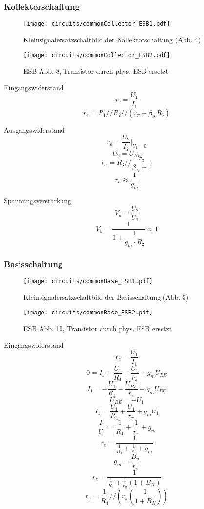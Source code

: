 \subsubsection{Kollektorschaltung}
\begin{figure}[H]
  \begin{center}
    \texttt{[image: circuits/commonCollector\_ESB1.pdf]}
  \end{center}
  \caption{Kleinsignalersatzschaltbild der Kollektorschaltung (Abb. 4)}
\end{figure}


\begin{figure}[H]
  \begin{center}
   \texttt{[image: circuits/commonCollector\_ESB2.pdf]}
  \end{center}
  \caption{ESB Abb. 8, Transistor durch phys. ESB ersetzt}
\end{figure}
\noindent Eingangswiderstand
\[ r_e = \frac{U_1}{I_1}\]
\[ r_e = R_1 // R_2 // (r_\pi + \beta_N R_3)\]

\noindent Ausgangswiderstand
\[ r_a = \frac{U_2}{I_2}|_{U_1 = 0}\]
\[U_2 = U_{BE}\]
\[r_a = R_3 // \frac{r_\pi }{\beta_N + 1}\]
\[r_a \approx \frac{1}{g_m}\]

\noindent Spannungsverstärkung
\[ V_u = \frac{U_2}{U_1}\]
\[V_u = \frac{1}{1+ \dfrac{1}{g_m \cdot R_3}} \approx 1\]

\subsubsection{Basisschaltung}
\begin{figure}[H]
  \begin{center}
    \texttt{[image: circuits/commonBase\_ESB1.pdf]}
  \end{center}
  \caption{Kleinsignalersatzschaltbild der Basisschaltung (Abb. 5)}
\end{figure}

\begin{figure}[H]
  \begin{center}
    \texttt{[image: circuits/commonBase\_ESB2.pdf]}
  \end{center}
  \caption{ESB Abb. 10, Transistor durch phys. ESB ersetzt}
\end{figure}

\noindent Eingangswiderstand
\[ r_e = \frac{U_1}{I_1}\]
\[0 = I_1 + \frac{U_1}{R_4} + \frac{U_1}{r_\pi} + g_m U_{BE} \]
\[I_1 = - \frac{U_1}{R_4} - \frac{U_{BE}}{r_\pi} - g_m U_{BE} \]
\[U_{BE} = - U_1\]
\[I_1 = \frac{U_1}{R_4} + \frac{U_1}{r_\pi} + g_m U_{1} \]
\[ \frac{I_1}{U_1} = \frac{1}{R_4} + \frac{1}{r_\pi} + g_m \]
\[ r_e = \frac{1}{ \frac{1}{R_4} + \frac{1}{r_\pi} + g_m} \]
\[g_m = \frac{B_n}{r_\pi}\]
\[ r_e = \frac{1}{\frac{1}{R_4} + \frac{1}{r_\pi} (1+B_N)} \]
\[ r_e = \frac{1}{R_4} // (r_\pi (\frac{1}{1+B_N}))\]

